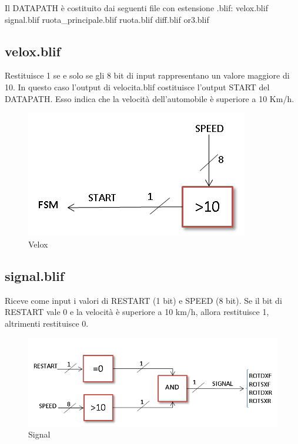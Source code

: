 \documentclass[a4paper,titlepage]{book}
\begin{document}
Il DATAPATH è costituito dai seguenti file con estensione .blif: velox.blif signal.blif ruota\_principale.blif ruota.blif diff.blif or3.blif




\subsection{velox.blif}
Restituisce 1 se e solo se gli 8 bit di input rappresentano un valore maggiore di 10. In questo caso l'output di velocita.blif costituisce l'output START del DATAPATH. Esso indica che la velocità dell'automobile è superiore a 10 Km/h.



\begin{figure}[!hb]
\centering
\includegraphics[scale=0.5]{schemi/velox.png}
\caption{Velox}
\end{figure}


\subsection{signal.blif}
Riceve come input i valori di RESTART (1 bit) e SPEED (8 bit). Se il bit di RESTART vale 0 e la velocità è superiore a 10 km/h, allora restituisce 1, altrimenti restituisce 0.



\begin{figure}[!hb]
\centering
\includegraphics[scale=0.5]{schemi/signal.png}
\caption{Signal}
\end{figure}
\end{document}
